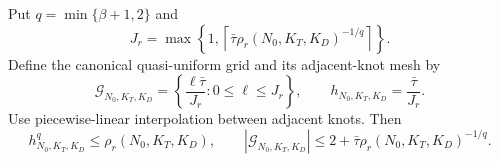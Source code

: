 Put \(q=\min\{\beta+1,2\}\) and
\[
 J_r=\max\left\{1,
 \left\lceil\bar\tau\rho_r(N_0,K_T,K_D)^{-1/q}\right\rceil
 \right\}.
\]
Define the canonical quasi-uniform grid and its adjacent-knot mesh by
\[
 \mathcal G_{N_0,K_T,K_D}
 =\left\{\frac{\ell\bar\tau}{J_r}:0\le\ell\le J_r\right\},
 \qquad h_{N_0,K_T,K_D}=\frac{\bar\tau}{J_r}.
\]
Use piecewise-linear interpolation between adjacent knots. Then
\[
 h_{N_0,K_T,K_D}^{q}\le\rho_r(N_0,K_T,K_D),
 \qquad
 |\mathcal G_{N_0,K_T,K_D}|
 \le2+\bar\tau\rho_r(N_0,K_T,K_D)^{-1/q}.
\]